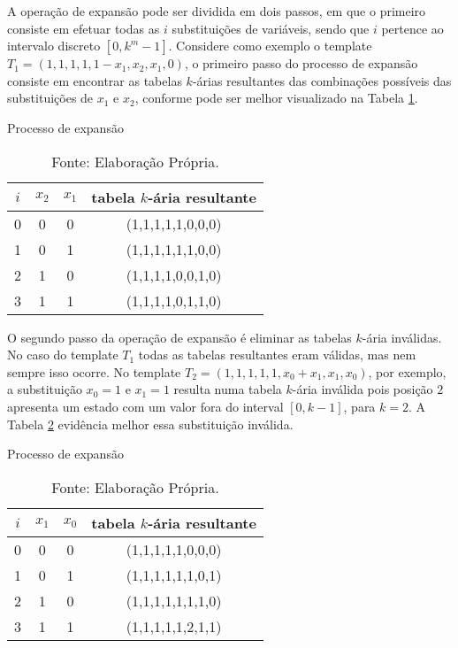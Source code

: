 A operação de expansão pode ser dividida em dois passos, em que o primeiro consiste em efetuar todas as $i$ substituições de variáveis, sendo que $i$ pertence ao intervalo discreto $[0,k^m-1]$. Considere como exemplo o template $T_1 = (1,1,1,1,1-x_1,x_2,x_1,0)$, o primeiro passo do processo de expansão consiste em encontrar as tabelas $k$-árias resultantes das combinações possíveis das substituições de $x_1$ e $x_2$, conforme pode ser melhor visualizado na Tabela \ref{tab:expansionProcess}.
\begin{table}[h!]
\centering
\caption{Processo de expansão}
	\begin{tabular}{cccc}
    \toprule
	$i$ & $x_2$ & $x_1$ & tabela $k$-ária resultante \\
    \midrule
	0	&	0	&	0	&	(1,1,1,1,1,0,0,0)	\\
	1	&	0	&	1	&	(1,1,1,1,1,1,0,0)	\\
	2	&	1	&	0	&	(1,1,1,1,0,0,1,0)	\\
	3	&	1	&	1	&	(1,1,1,1,0,1,1,0)	\\
    \bottomrule
	\end{tabular}
\caption*{Fonte: Elaboração Própria.}
\label{tab:expansionProcess}
\end{table}

O segundo passo da operação de expansão é eliminar as tabelas $k$-ária inválidas. No caso do template $T_1$ todas as tabelas resultantes eram válidas, mas nem sempre isso ocorre. No template $T_2 = (1,1,1,1,1,x_0+x_1,x_1,x_0)$, por exemplo, a substituição $x_0 = 1$ e $x_1 = 1$ resulta numa tabela $k$-ária inválida pois posição $2$ apresenta um estado com um valor fora do interval $[0,k-1]$, para $k=2$. A Tabela \ref{tab:invalideExpansion} evidência melhor essa substituição inválida.
\begin{table}[h!]
\centering
\caption{Processo de expansão}
	\begin{tabular}{cccc}
    \toprule
	$i$ & $x_1$ & $x_0$ & tabela $k$-ária resultante \\
    \midrule
	0	&	0	&	0	&	(1,1,1,1,1,0,0,0)	\\
	1	&	0	&	1	&	(1,1,1,1,1,1,0,1)	\\
	2	&	1	&	0	&	(1,1,1,1,1,1,1,0)	\\
	3	&	1	&	1	&	(1,1,1,1,1,2,1,1)	\\
    \bottomrule
   	\end{tabular}
\caption*{Fonte: Elaboração Própria.}
\label{tab:invalideExpansion}
\end{table}

